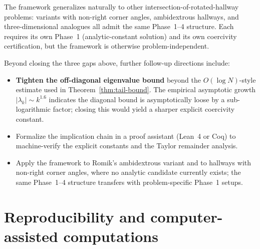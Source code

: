 \documentclass[11pt]{amsart}
\theoremstyle{plain}
\theoremstyle{definition}
\begin{document}
The framework generalizes naturally to other
intersection-of-rotated-hallway problems: variants with non-right
corner angles, ambidextrous hallways, and three-dimensional analogues
all admit the same Phase~1--4 structure.  Each requires its own
Phase~1 (analytic-constant solution) and its own coercivity
certification, but the framework is otherwise problem-independent.

Beyond closing the three gaps above, further follow-up directions
include:
\begin{itemize}
\item \textbf{Tighten the off-diagonal eigenvalue bound} beyond the
      $O(\log N)$-style estimate used in Theorem~\ref{thm:tail-bound}.
      The empirical asymptotic growth $|\lambda_{k}| \sim k^{1.6}$
      indicates the diagonal bound is asymptotically loose by a
      sub-logarithmic factor; closing this would yield a sharper
      explicit coercivity constant.
\item Formalize the implication chain in a proof assistant
      (Lean~4 or Coq) to machine-verify the explicit constants and
      the Taylor remainder analysis.
\item Apply the framework to Romik's ambidextrous variant and to
      hallways with non-right corner angles, where no analytic
      candidate currently exists; the same Phase~1--4 structure
      transfers with problem-specific Phase~1 setups.
\end{itemize}

\section*{Reproducibility and computer-assisted computations}
\end{document}

